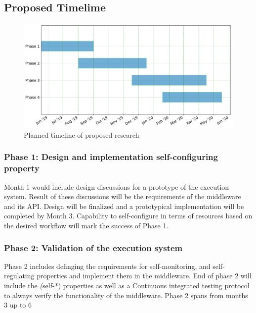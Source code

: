 
\subsection{Proposed Timelime}
\begin{figure}[t]
	\centering
	\includegraphics[width=.95\textwidth]{Proposal/phd_plan.pdf}
	\caption{Planned timeline of proposed research}\label{tab:work_plan}
\end{figure}

\subsubsection{Phase 1: Design and implementation self-configuring property}

Month 1 would include design discussions for a prototype of the execution system. 
Result of these discussions will be the requirements of the middleware and its 
API. Design will be finalized and a prototypical implementation will be completed 
by Month 3. Capability to self-configure in terms of resources based on the desired 
workflow will mark the success of Phase 1.

\subsubsection{Phase 2: Validation of the execution system}
Phase 2 includes definging the requirements for self-monitoring, and self-regulating 
properties and implement them in the middleware. End of phase 2 will include the 
\textit(self-*) properties as well as a Continuous integrated testing protocol to 
always verify the functionality of the middleware. Phase 2 spans from months 3 up 
to 6

